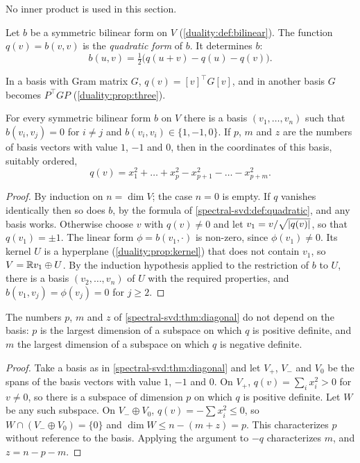 \begin{notechapter}
No inner product is used in this section.

\begin{definition}\label{spectral-svd:def:quadratic}
Let $b$ be a symmetric bilinear form on $V$
(\cref{duality:def:bilinear}). The function $q(v) = b(v, v)$ is the
\emph{quadratic form} of $b$. It determines $b$:
\[
  b(u, v) = \tfrac12\bigl(q(u + v) - q(u) - q(v)\bigr) .
\]
\end{definition}

In a basis with Gram matrix $G$, $q(v) = [v]^\top G[v]$, and in another
basis $G$ becomes $P^\top GP$ (\cref{duality:prop:three}).

\begin{theorem}\label{spectral-svd:thm:diagonal}
For every symmetric bilinear form $b$ on $V$ there is a basis
$(v_1,\dots,v_n)$ such that $b(v_i, v_j) = 0$ for $i\neq j$ and
$b(v_i, v_i)\in\{1, -1, 0\}$. If $p$, $m$ and $z$ are the numbers of basis
vectors with value $1$, $-1$ and $0$, then in the coordinates of this
basis, suitably ordered,
\[
  q(v) = x_1^2 + \dots + x_p^2 - x_{p+1}^2 - \dots - x_{p+m}^2 .
\]
\end{theorem}

\begin{proof}
By induction on $n = \dim V$; the case $n = 0$ is empty. If $q$ vanishes
identically then so does $b$, by the formula of
\cref{spectral-svd:def:quadratic}, and any basis works. Otherwise choose
$v$ with $q(v)\neq0$ and let $v_1 = v/\sqrt{\left|q(v)\right|}$, so that
$q(v_1) = \pm1$. The linear form $\phi = b(v_1, \cdot)$ is non-zero, since
$\phi(v_1)\neq0$. Its kernel $U$ is a hyperplane
(\cref{duality:prop:kernel}) that does not contain $v_1$, so
$V = \mathbb{R} v_1\oplus U$. By the induction hypothesis applied to the
restriction of $b$ to $U$, there is a basis $(v_2,\dots,v_n)$ of $U$ with
the required properties, and $b(v_1, v_j) = \phi(v_j) = 0$ for
$j\geq2$.
\end{proof}

\begin{theorem}\label{spectral-svd:thm:sylvester}
The numbers $p$, $m$ and $z$ of \cref{spectral-svd:thm:diagonal} do not
depend on the basis: $p$ is the largest dimension of a subspace on which
$q$ is positive definite, and $m$ the largest dimension of a subspace on
which $q$ is negative definite.
\end{theorem}

\begin{proof}
Take a basis as in \cref{spectral-svd:thm:diagonal} and let $V_+$, $V_-$
and $V_0$ be the spans of the basis vectors with value $1$, $-1$ and $0$.
On $V_+$, $q(v) = \sum_ix_i^2 > 0$ for $v\neq0$, so there is a subspace of
dimension $p$ on which $q$ is positive definite. Let $W$ be any such
subspace. On $V_-\oplus V_0$, $q(v) = -\sum x_i^2\leq0$, so
$W\cap(V_-\oplus V_0) = \{0\}$ and
$\dim W\leq n - (m + z) = p$. This characterizes $p$ without reference to
the basis. Applying the argument to $-q$ characterizes $m$, and
$z = n - p - m$.
\end{proof}


\end{notechapter}

